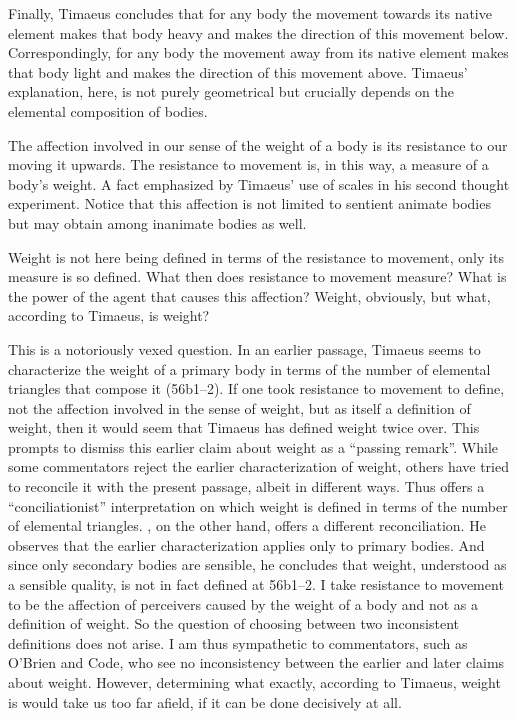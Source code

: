 Finally, Timaeus concludes that for any body the movement towards its native element makes that body heavy and makes the direction of this movement below. Correspondingly, for any body the movement away from its native element makes that body light and makes the direction of this movement above. Timaeus' explanation, here, is not purely geometrical but crucially depends on the elemental composition of bodies.

The affection involved in our sense of the weight of a body is its resistance to our moving it upwards. The resistance to movement is, in this way, a measure of a body's weight. A fact emphasized by Timaeus' use of scales in his second thought experiment. Notice that this affection is not limited to sentient animate bodies but may obtain among inanimate bodies as well.

Weight is not here being defined in terms of the resistance to movement, only its measure is so defined. What then does resistance to movement measure? What is the power of the agent that causes this affection? Weight, obviously, but what, according to Timaeus, is weight?

This is a notoriously vexed question. In an earlier passage, Timaeus seems to characterize the weight of a primary body in terms of the number of elemental triangles that compose it (56b1--2). If one took resistance to movement to define, not the affection involved in the sense of weight, but as itself a definition of weight, then it would seem that Timaeus has defined weight twice over. This prompts \citet[136--d]{Cherniss:1944ma} to dismiss this earlier claim about weight as a ``passing remark''. While some commentators reject the earlier characterization of weight, others have tried to reconcile it with the present passage, albeit in different ways. Thus \citet[chapter 8]{OBrien:1984ji} offers a ``conciliationist'' interpretation on which weight is defined in terms of the number of elemental triangles. \citet{Code:2010bz}, on the other hand, offers a different reconciliation. He observes that the earlier characterization applies only to primary bodies. And since only secondary bodies are sensible, he concludes that weight, understood as a sensible quality, is not in fact defined at 56b1--2. I take resistance to movement to be the affection of perceivers caused by the weight of a body and not as a definition of weight. So the question of choosing between two inconsistent definitions does not arise. I am thus sympathetic to commentators, such as O'Brien and Code, who see no inconsistency between the earlier and later claims about weight. However, determining what exactly, according to Timaeus, weight is would take us too far afield, if it can be done decisively at all.

